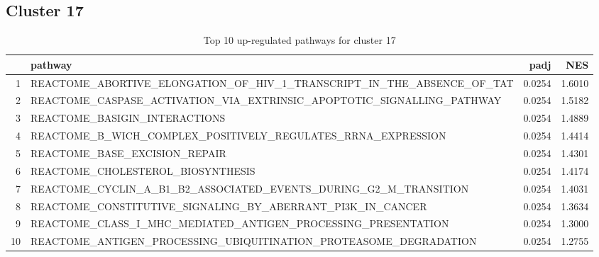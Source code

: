 \documentclass{article}
\begin{document}
\subsection{Cluster 17 }
\begin{table}[H]
\centering
\begin{tabularx}{\textwidth}{rlrr}
  \hline
 & pathway & padj & NES \\ 
  \hline
1 & REACTOME\_ABORTIVE\_ELONGATION\_OF\_HIV\_1\_TRANSCRIPT\_IN\_THE\_ABSENCE\_OF\_TAT & 0.0254 & 1.6010 \\ 
  2 & REACTOME\_CASPASE\_ACTIVATION\_VIA\_EXTRINSIC\_APOPTOTIC\_SIGNALLING\_PATHWAY & 0.0254 & 1.5182 \\ 
  3 & REACTOME\_BASIGIN\_INTERACTIONS & 0.0254 & 1.4889 \\ 
  4 & REACTOME\_B\_WICH\_COMPLEX\_POSITIVELY\_REGULATES\_RRNA\_EXPRESSION & 0.0254 & 1.4414 \\ 
  5 & REACTOME\_BASE\_EXCISION\_REPAIR & 0.0254 & 1.4301 \\ 
  6 & REACTOME\_CHOLESTEROL\_BIOSYNTHESIS & 0.0254 & 1.4174 \\ 
  7 & REACTOME\_CYCLIN\_A\_B1\_B2\_ASSOCIATED\_EVENTS\_DURING\_G2\_M\_TRANSITION & 0.0254 & 1.4031 \\ 
  8 & REACTOME\_CONSTITUTIVE\_SIGNALING\_BY\_ABERRANT\_PI3K\_IN\_CANCER & 0.0254 & 1.3634 \\ 
  9 & REACTOME\_CLASS\_I\_MHC\_MEDIATED\_ANTIGEN\_PROCESSING\_PRESENTATION & 0.0254 & 1.3000 \\ 
  10 & REACTOME\_ANTIGEN\_PROCESSING\_UBIQUITINATION\_PROTEASOME\_DEGRADATION & 0.0254 & 1.2755 \\ 
   \hline
\end{tabularx}
\caption{Top 10 up-regulated pathways for cluster 17} 
\label{tab:q3_2_17}
\end{table}
\end{document}
